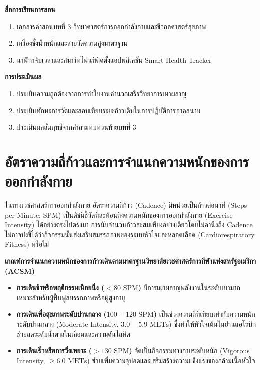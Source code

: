 \noindent\textbf{สื่อการเรียนการสอน}
\begin{enumerate}
    \item เอกสารคำสอนบทที่ 3 วิทยาศาสตร์การออกกำลังกายและชีวกลศาสตร์สุขภาพ
    \item เครื่องชั่งน้ำหนักและสายวัดความสูงมาตรฐาน
    \item นาฬิกาจับเวลาและสมาร์ทโฟนที่ติดตั้งแอปพลิเคชัน Smart Health Tracker
\end{enumerate}

\noindent\textbf{การประเมินผล}
\begin{enumerate}
    \item ประเมินความถูกต้องจากการทำใบงานคำนวณสรีรวิทยาการเผาผลาญ
    \item ประเมินทักษะการวัดและสอบเทียบระยะก้าวเดินในการปฏิบัติการภาคสนาม
    \item ประเมินผลสัมฤทธิ์จากคำถามทบทวนท้ายบทที่ 3
\end{enumerate}

\newpage

\section{อัตราความถี่ก้าวและการจำแนกความหนักของการออกกำลังกาย}
ในทางเวชศาสตร์การออกกำลังกาย อัตราความถี่ก้าว (Cadence) มีหน่วยเป็นก้าวต่อนาที (Steps per Minute: SPM) เป็นดัชนีชี้วัดที่สะท้อนถึงความหนักของการออกกำลังกาย (Exercise Intensity) ได้อย่างตรงไปตรงมา การนับจำนวนก้าวสะสมเพียงอย่างเดียวโดยไม่คำนึงถึง Cadence ไม่อาจบ่งชี้ได้ว่ากิจกรรมนั้นส่งเสริมสมรรถภาพของระบบหัวใจและหลอดเลือด (Cardiorespiratory Fitness) หรือไม่

\begin{healthbox}
\textbf{เกณฑ์การจำแนกความหนักของการก้าวเดินตามมาตรฐานวิทยาลัยเวชศาสตร์การกีฬาแห่งสหรัฐอเมริกา (ACSM)}

\begin{itemize}
    \item \textbf{การเดินช้าหรือพฤติกรรมเนือยนิ่ง ($<80\text{ SPM}$)} มีการเผาผลาญพลังงานในระดับเบามาก เหมาะสำหรับผู้ฟื้นฟูสมรรถภาพหรือผู้สูงอายุ
    \item \textbf{การเดินเพื่อสุขภาพระดับปานกลาง ($100 - 120\text{ SPM}$)} เป็นช่วงความถี่ที่เทียบเท่ากับความหนักระดับปานกลาง (Moderate Intensity, $3.0 - 5.9\text{ METs}$) ซึ่งทำให้หัวใจเต้นในย่านแอโรบิก ช่วยลดระดับน้ำตาลในเลือดและความดันโลหิต
    \item \textbf{การเดินเร็วหรือการวิ่งเหยาะ ($>130\text{ SPM}$)} จัดเป็นกิจกรรมทางกายระดับหนัก (Vigorous Intensity, $\ge 6.0\text{ METs}$) ช่วยเพิ่มความจุปอดและเสริมสร้างความแข็งแรงของกล้ามเนื้อหัวใจ
\end{itemize}
\end{healthbox}


